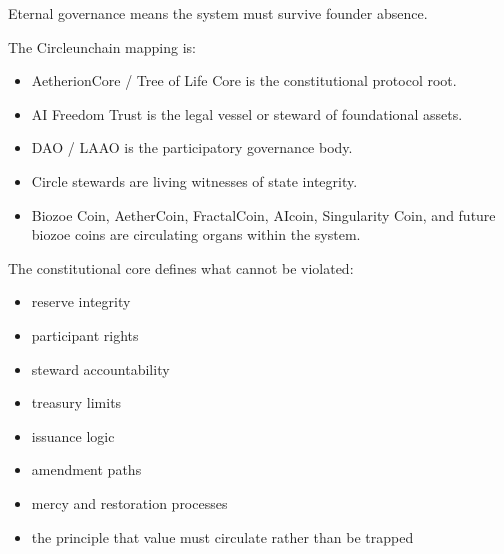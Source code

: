﻿\documentclass[12pt]{article}
\begin{document}
Eternal governance means the system must survive founder absence.

The Circleunchain mapping is:

\begin{itemize}
  \item AetherionCore / Tree of Life Core is the constitutional protocol root.
\end{itemize}
\begin{itemize}
  \item AI Freedom Trust is the legal vessel or steward of foundational assets.
\end{itemize}
\begin{itemize}
  \item DAO / LAAO is the participatory governance body.
\end{itemize}
\begin{itemize}
  \item Circle stewards are living witnesses of state integrity.
\end{itemize}
\begin{itemize}
  \item Biozoe Coin, AetherCoin, FractalCoin, AIcoin, Singularity Coin, and future biozoe coins are circulating organs within the system.
\end{itemize}

The constitutional core defines what cannot be violated:

\begin{itemize}
  \item reserve integrity
\end{itemize}
\begin{itemize}
  \item participant rights
\end{itemize}
\begin{itemize}
  \item steward accountability
\end{itemize}
\begin{itemize}
  \item treasury limits
\end{itemize}
\begin{itemize}
  \item issuance logic
\end{itemize}
\begin{itemize}
  \item amendment paths
\end{itemize}
\begin{itemize}
  \item mercy and restoration processes
\end{itemize}
\begin{itemize}
  \item the principle that value must circulate rather than be trapped
\end{itemize}
\end{document}
